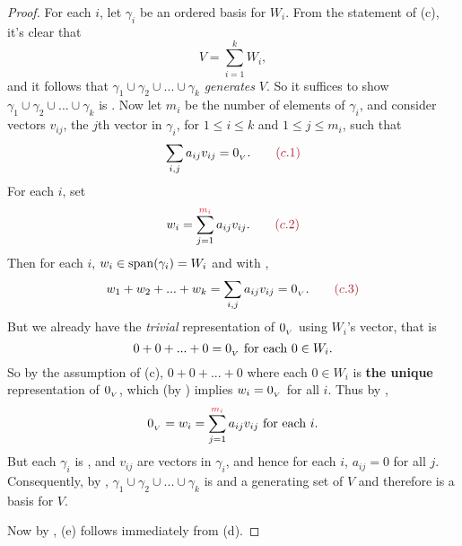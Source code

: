 \begin{proof}
For each \(i\), let \(\gamma_i\) be an ordered basis for \(W_i\).
From the statement of (c), it's clear that
\[
    V = \sum_{i = 1}^k W_i,
\]
and it follows that \(\gamma_1 \cup \gamma_2 \cup ... \cup \gamma_k\) \emph{generates} \(V\).
So it suffices to show \(\gamma_1 \cup \gamma_2 \cup ... \cup \gamma_k\) is \LID{}.
Now let \(m_i\) be the number of elements of \(\gamma_i\), and consider vectors \(v_{ij}\), the \(j\)th vector in \(\gamma_i\), for \(1 \le i \le k\) and \(1 \le j \le m_i\), such that
\[
    \sum_{i, j} a_{ij} v_{ij} = \OV. \quad \quad \MAROON{(c.1)}
\]
For each \(i\), set
\[
    w_i = \sum_{j = 1}^{\RED{m_i}} a_{ij} v_{ij}. \quad \quad \MAROON{(c.2)}
\]
Then for each \(i\), \(w_i \in \operatorname{span}(\gamma_i) = W_i\) and with ,
\[
    w_1 + w_2 + ... + w_k = \sum_{i, j} a_{ij} v_{ij} = \OV. \quad \quad \MAROON{(c.3)}
\]
But we already have the \emph{trivial} representation of \(0_{_V}\) using \(W_i\)'s vector, that is
\[
    0 + 0 + ... + 0 = 0_{_V} \text{ for each } 0 \in W_i.
\]
So by the assumption of (c), \(0 + 0 + ... + 0\) where each \(0 \in W_i\) is \textbf{the unique} representation of \(0_{_V}\), which (by ) implies \(w_i = 0_{_V}\) for all \(i\).
Thus by ,
\[
    \OV = w_i = \sum_{j = 1}^{\RED{m_i}} a_{ij} v_{ij} \text{ for each } i.
\]
But each \(\gamma_i\) is \LID{}, and \(v_{ij}\) are vectors in \(\gamma_i\), and hence for each \(i\), \(a_{ij} = 0\) for all \(j\).
Consequently, by , \(\gamma_1 \cup \gamma_2 \cup ... \cup \gamma_k\) is \LID{} and a generating set of \(V\) and therefore is a basis for \(V\).

Now by , (e) follows immediately from (d).


\end{proof}
